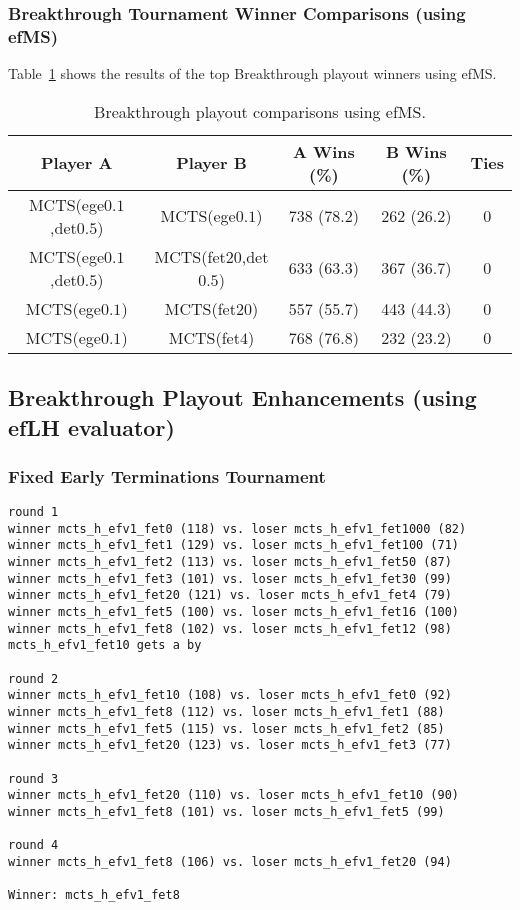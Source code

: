 \documentclass{article}
\begin{document}
\subsubsection{Breakthrough Tournament Winner Comparisons (using efMS)}

Table~\ref{tbl:bt-efMS-toptourney} shows the results of the top Breakthrough playout winners using efMS.

\begin{table}[h!]
\begin{center}
\begin{tabular}{|c|c|ccc|}
\hline
Player A & Player B                             & A Wins (\%)  & B Wins (\%)  & Ties \\ 
\hline
MCTS(ege$0.1$,det$0.5$) & MCTS(ege$0.1$)        & 738 (78.2)   & 262 (26.2)   & 0    \\
MCTS(ege$0.1$,det$0.5$) & MCTS(fet$20$,det$0.5$) & 633 (63.3)   & 367 (36.7)   & 0    \\
MCTS(ege$0.1$)          & MCTS(fet$20$)          & 557 (55.7)   & 443 (44.3)   & 0    \\
MCTS(ege$0.1$)          & MCTS(fet$4$)           & 768 (76.8)   & 232 (23.2)   & 0    \\
\hline
\end{tabular}
\end{center}
\caption{Breakthrough playout comparisons using efMS. \label{tbl:bt-efMS-toptourney}}
\end{table}

\subsection{Breakthrough Playout Enhancements (using efLH evaluator)}

\subsubsection{Fixed Early Terminations Tournament}

\begin{verbatim}
round 1
winner mcts_h_efv1_fet0 (118) vs. loser mcts_h_efv1_fet1000 (82)
winner mcts_h_efv1_fet1 (129) vs. loser mcts_h_efv1_fet100 (71)
winner mcts_h_efv1_fet2 (113) vs. loser mcts_h_efv1_fet50 (87)
winner mcts_h_efv1_fet3 (101) vs. loser mcts_h_efv1_fet30 (99)
winner mcts_h_efv1_fet20 (121) vs. loser mcts_h_efv1_fet4 (79)
winner mcts_h_efv1_fet5 (100) vs. loser mcts_h_efv1_fet16 (100)
winner mcts_h_efv1_fet8 (102) vs. loser mcts_h_efv1_fet12 (98)
mcts_h_efv1_fet10 gets a by

round 2
winner mcts_h_efv1_fet10 (108) vs. loser mcts_h_efv1_fet0 (92)
winner mcts_h_efv1_fet8 (112) vs. loser mcts_h_efv1_fet1 (88)
winner mcts_h_efv1_fet5 (115) vs. loser mcts_h_efv1_fet2 (85)
winner mcts_h_efv1_fet20 (123) vs. loser mcts_h_efv1_fet3 (77)

round 3
winner mcts_h_efv1_fet20 (110) vs. loser mcts_h_efv1_fet10 (90)
winner mcts_h_efv1_fet8 (101) vs. loser mcts_h_efv1_fet5 (99)

round 4
winner mcts_h_efv1_fet8 (106) vs. loser mcts_h_efv1_fet20 (94)

Winner: mcts_h_efv1_fet8
\end{verbatim}
\end{document}
